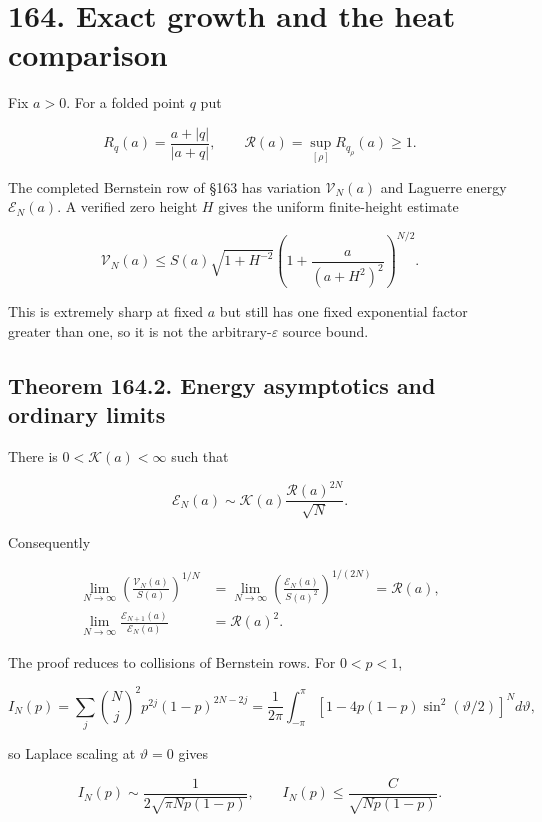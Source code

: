 \documentclass[
  11pt,
]{book}
\begin{document}
\section{164. Exact growth and the heat
comparison}\label{exact-growth-and-the-heat-comparison}

Fix \(a>0\). For a folded point \(q\) put

\[
R_q(a)=\frac{a+|q|}{|a+q|},\qquad
\mathcal R(a)=\sup_{[\rho]}R_{q_\rho}(a)\ge1.
\tag{164.1}
\]

The completed Bernstein row of §163 has variation \(\mathcal V_N(a)\)
and Laguerre energy \(\mathscr E_N(a)\). A verified zero height \(H\)
gives the uniform finite-height estimate

\[
\mathcal V_N(a)\le S(a)\sqrt{1+H^{-2}}
\left(1+\frac{a}{(a+H^2)^2}\right)^{N/2}.
\tag{164.4b}
\]

This is extremely sharp at fixed \(a\) but still has one fixed
exponential factor greater than one, so it is not the
arbitrary-\(\varepsilon\) source bound.

\subsection{Theorem 164.2. Energy asymptotics and ordinary
limits}\label{theorem-164.2.-energy-asymptotics-and-ordinary-limits}

There is \(0<\mathcal K(a)<\infty\) such that

\[
\boxed{\mathscr E_N(a)\sim
\mathcal K(a)\frac{\mathcal R(a)^{2N}}{\sqrt N}.}
\tag{164.5}
\]

Consequently

\[
\boxed{\begin{aligned}
\lim_{N\to\infty}\left(\frac{\mathcal V_N(a)}{S(a)}\right)^{1/N}
&=\lim_{N\to\infty}\left(\frac{\mathscr E_N(a)}{S(a)^2}\right)^{1/(2N)}
=\mathcal R(a),\\
\lim_{N\to\infty}\frac{\mathscr E_{N+1}(a)}{\mathscr E_N(a)}
&=\mathcal R(a)^2.
\end{aligned}}
\tag{164.6}
\]

The proof reduces to collisions of Bernstein rows. For \(0<p<1\),

\[
I_N(p)=\sum_j\binom Nj^2p^{2j}(1-p)^{2N-2j}
=\frac1{2\pi}\int_{-\pi}^{\pi}
[1-4p(1-p)\sin^2(\vartheta/2)]^N d\vartheta,
\tag{164.7}
\]

so Laplace scaling at \(\vartheta=0\) gives

\[
I_N(p)\sim\frac1{2\sqrt{\pi Np(1-p)}},
\qquad I_N(p)\le\frac{C}{\sqrt{Np(1-p)}}.
\tag{164.8}
\]
\end{document}
